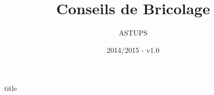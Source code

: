 \documentclass[a1,portrait]{a0poster}
\title{Conseils de Bricolage}
\author{ASTUPS}
\date{2014/2015 - v1.0}
\begin{document}
\thispagestyle{empty}

\begin{staticcontents*}{title}
\maketitle



\end{staticcontents*}












\end{document}
